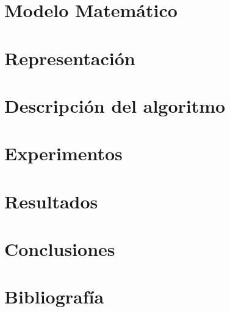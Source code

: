 \documentclass[letter, 10pt]{article}
\begin{document}
\section{Modelo Matemático}\label{sec:mod}

\section{Representación}\label{sec:repr}

\section{Descripción del algoritmo}\label{sec:alg}

\section{Experimentos}\label{sec:exp}

\section{Resultados}\label{sec:res}

\section{Conclusiones}\label{sec:conc}

\section{Bibliografía}\label{sec:bib}



\end{document}
